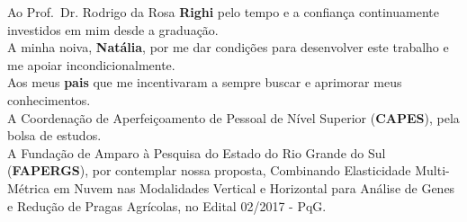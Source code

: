 \documentclass[english,brazilian]{UNISINOSmonografia} %
\begin{document}


\capa
\folhaderosto
\folhadeaprovacao %

%

\begin{agradecimentos}
	
	Ao Prof.~Dr. Rodrigo da Rosa \textbf{Righi} pelo tempo e a confiança continuamente investidos em mim desde a graduação.
	\\[1ex]
	
	A minha noiva, \textbf{Natália}, por me dar condições para desenvolver este trabalho e me apoiar incondicionalmente.
	\\[1ex]
	
	Aos meus \textbf{pais} que me incentivaram a sempre buscar e aprimorar meus conhecimentos.
	\\[1ex]
	
	A Coordenação de Aperfeiçoamento de Pessoal de Nível Superior (\textbf{CAPES}), pela bolsa de estudos.
	\\[1ex]

	A Fundação de Amparo à Pesquisa do Estado do Rio Grande do Sul (\textbf{FAPERGS}), por contemplar nossa proposta, Combinando Elasticidade Multi-Métrica em Nuvem nas Modalidades Vertical e Horizontal para Análise de Genes e Redução de Pragas Agrícolas, no Edital 02/2017 - PqG.

\end{agradecimentos}
\end{document}
